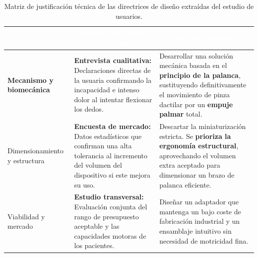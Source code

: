 \documentclass[11pt,a4paper]{article}
\begin{document}
\begin{table}[H]
    \centering
    \small
    \renewcommand{\arraystretch}{1.6}
    \renewcommand{\tabularxcolumn}[1]{m{#1}}
    \begin{tabularx}{\linewidth}{|>{\columncolor{ArthroNavy}\color{white}\bfseries\centering\arraybackslash}m{3.5cm} | X | X |}
        \hline
        \rowcolor{ArthroNavy}
        \multicolumn{1}{|c|}{\textcolor{white}{\textbf{Área de diseño}}} & 
        \multicolumn{1}{c|}{\textcolor{white}{\textbf{Origen y validación del dato}}} & 
        \multicolumn{1}{c|}{\textcolor{white}{\textbf{Decisión adoptada}}} \\ \hline
        
        Mecanismo y biomecánica & 
        \cellcolor{ArthroTeal!5}\textbf{Entrevista cualitativa:} \newline Declaraciones directas de la usuaria confirmando la incapacidad e intenso dolor al intentar flexionar los dedos. & 
        \cellcolor{ArthroTeal!5}Desarrollar una solución mecánica basada en el \textbf{principio de la palanca}, sustituyendo definitivamente el movimiento de pinza dactilar por un \textbf{empuje palmar} total. \\ \hline
        
        Dimensionamiento y estructura & 
        \textbf{Encuesta de mercado:} \newline Datos estadísticos que confirman una alta tolerancia al incremento del volumen del dispositivo si este mejora su uso. & 
        Descartar la miniaturización estricta. Se \textbf{prioriza la ergonomía estructural}, aprovechando el volumen extra aceptado para dimensionar un brazo de palanca eficiente. \\ \hline
        
        Viabilidad y mercado & 
        \cellcolor{ArthroTeal!5}\textbf{Estudio transversal:} \newline Evaluación conjunta del rango de presupuesto aceptable y las capacidades motoras de los pacientes. & 
        \cellcolor{ArthroTeal!5}Diseñar un adaptador que mantenga un bajo coste de fabricación industrial y un ensamblaje intuitivo sin necesidad de motricidad fina. \\ \hline
    \end{tabularx}
    \caption{Matriz de justificación técnica de las directrices de diseño extraídas del estudio de usuarios.}
    \label{tab:justificacion_decisiones}
\end{table}

\vspace{1.5cm}
\end{document}
